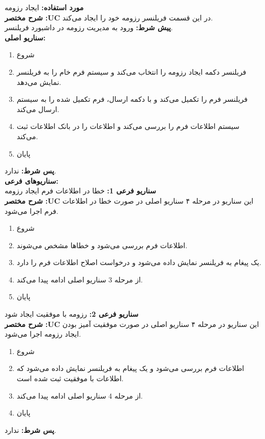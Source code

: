 \textbf{مورد استفاده:}
ایجاد رزومه
\\
\textbf{شرح مختصر :UC}
در این قسمت فریلنسر رزومه خود را ایجاد می‌کند.
\\
\textbf{پيش شرط:}
ورود به مدیریت رزومه در داشبورد فریلنسر.
\\
\textbf{سناريو اصلی:}
\begin{enumerate}
\item
شروع
\item
فریلنسر دکمه ایجاد رزومه را انتخاب می‌کند و سیستم فرم خام را به فریلنسر نمایش می‌دهد.
\item
فریلنسر فرم را تکمیل می‌کند و با دکمه ارسال، فرم تکمیل شده را به سیستم ارسال می‌کند.
\item
سیستم اطلاعات فرم را بررسی می‌کند و اطلاعات را در بانک اطلاعات ثبت می‌کند.
\item
پایان
\end{enumerate}

\noindent
\textbf{پس شرط:}
ندارد.
\\
\textbf{سناريوهای فرعی:}
\\
\textbf{سناريو فرعی 1:}
خطا در اطلاعات فرم ایجاد رزومه
\\
\textbf{شرح مختصر :UC}
این سناریو در مرحله ۴ سناریو اصلی در صورت خطا در اطلاعات فرم اجرا می‌شود.
\begin{enumerate}
\item
شروع
\item
اطلاعات فرم بررسی می‌شود و خطاها مشخص می‌شوند.
\item
یک پیغام به فریلنسر نمایش داده می‌شود و درخواست اصلاح اطلاعات فرم را دارد.
\item
از مرحله 3 سناریو اصلی ادامه پیدا می‌کند.
\item
پایان
\end{enumerate}

\noindent
\textbf{سناريو فرعی 2:}
رزومه با موفقیت ایجاد شود
\\
\textbf{شرح مختصر :UC}
این سناریو در مرحله ۴ سناریو اصلی در صورت موفقیت آمیز بودن ایجاد رزومه اجرا می‌شود.
\begin{enumerate}
\item
شروع
\item
اطلاعات فرم بررسی می‌شود و یک پیغام به فریلنسر نمایش داده می‌شود که اطلاعات با موفقیت ثبت شده است.
\item
از مرحله 4 سناریو اصلی ادامه پیدا می‌کند.
\item
پایان
\end{enumerate}

\noindent
\textbf{پس شرط:}
ندارد.



